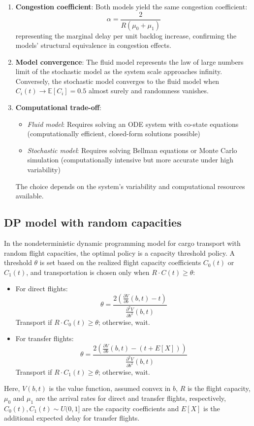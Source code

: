 \documentclass[opre,sglanonrev]{informs4}
\begin{document}
{\begin{enumerate}
    \item \textbf{Congestion coefficient}: Both models yield the same congestion coefficient:
    \[
    \alpha = \frac{2}{R(\mu_0 + \mu_1)}
    \]
    representing the marginal delay per unit backlog increase, confirming the models' structural equivalence in congestion effects.
    
    \item \textbf{Model convergence}: The fluid model represents the law of large numbers limit of the stochastic model as the system scale approaches infinity. Conversely, the stochastic model converges to the fluid model when \( C_i(t) \to \mathbb{E}[C_i] = 0.5 \) almost surely and randomness vanishes.
    
    \item \textbf{Computational trade-off}: 
    \begin{itemize}
        \item \textit{Fluid model}: Requires solving an ODE system with co-state equations (computationally efficient, closed-form solutions possible)
        \item \textit{Stochastic model}: Requires solving Bellman equations or Monte Carlo simulation (computationally intensive but more accurate under high variability)
    \end{itemize}
    The choice depends on the system's variability and computational resources available.
\end{enumerate}
}

\subsection{DP model with random capacities}


\begin{theorem}
\label{thm:capacity_threshold_policy}
In the nondeterministic dynamic programming model for cargo transport with random flight capacities, the optimal policy is a capacity threshold policy. A threshold \( \theta \) is set based on the realized flight capacity coefficients \( C_0(t) \) or \( C_1(t) \), and transportation is chosen only when \( R \cdot C(t) \geq \theta \):
\begin{itemize}
    \item For direct flights: 
    \[
    \theta = \frac{2 \left( \frac{\partial V}{\partial b}(b, t) - t \right)}{\frac{\partial^2 V}{\partial b^2}(b, t)}
    \]
    Transport if \( R \cdot C_0(t) \geq \theta \); otherwise, wait.
    \item For transfer flights: 
    \[
    \theta = \frac{2 \left( \frac{\partial V}{\partial b}(b, t) - (t + E[X]) \right)}{\frac{\partial^2 V}{\partial b^2}(b, t)}
    \]
    Transport if \( R \cdot C_1(t) \geq \theta \); otherwise, wait.
\end{itemize}
Here, \( V(b, t) \) is the value function, assumed convex in \( b \), \( R \) is the flight capacity, \( \mu_0 \) and \( \mu_1 \) are the arrival rates for direct and transfer flights, respectively, \( C_0(t), C_1(t) \sim U(0,1] \) are the capacity coefficients and \( E[X] \) is the additional expected delay for transfer flights.
\end{theorem}
\end{document}

